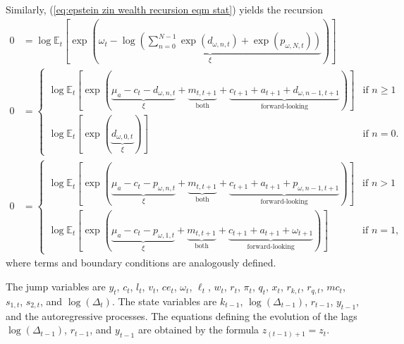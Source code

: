 \documentclass[12 pt, oneside]{article}
\theoremstyle{definition}
\theoremstyle{definition}
\theoremstyle{definition}
\newcommand{\E}{\mathbb{E}}
\begin{document}
Similarly, (\ref{eq:epstein zin wealth recursion eqm stat}) yields the recursion
\begin{align}
  0 & = \log\E_t\left[\exp\left(\underbrace{\omega_t - \log\left(\sum_{n = 0}^{N - 1}\exp(d_{\omega, n, t}) + \exp(p_{\omega, N, t})\right)}_{\xi}\right)\right]\\
  0 & =
      \begin{cases}
        \log\E_t\left[\exp\left(\underbrace{\mu_a - c_t - d_{\omega, n, t}}_{\xi} + \underbrace{m_{t, t + 1}}_{\text{both}} + \underbrace{c_{t + 1} + a_{t + 1} + d_{\omega, n - 1, t + 1}}_{\text{forward-looking}}\right)\right] & \text{if } n \geq 1\\
        \log\E_t\left[\exp\left(\underbrace{d_{\omega, 0, t}}_{\xi}\right)\right] & \text{if } n = 0.
      \end{cases}\\
  0 & =
      \begin{cases}
        \log\E_t\left[\exp\left(\underbrace{\mu_a - c_t - p_{\omega, n, t}}_{\xi} + \underbrace{m_{t, t + 1}}_{\text{both}} + \underbrace{c_{t + 1} + a_{t + 1} + p_{\omega, n - 1, t + 1}}_{\text{forward-looking}} \right)\right] & \text{if } n > 1\\
        \log\E_t\left[\exp\left(\underbrace{\mu_a - c_t - p_{\omega, 1, t}}_{\xi} + \underbrace{m_{t, t + 1}}_{\text{both}} + \underbrace{c_{t + 1} + a_{t + 1} + \omega_{t + 1}}_{\text{forward-looking}}\right)\right] & \text{if } n = 1,
      \end{cases}
\end{align}
where terms and boundary conditions are analogously defined.

The jump variables are $y_t$, $c_t$, $l_t$, $v_t$, $ce_t$, $\omega_t$, $\ell_t$, $w_t$, $r_t$, $\pi_t$, $q_t$, $x_t$, $r_{k, t}$, $r_{q, t}$, $mc_t$, $s_{1, t}$, $s_{2, t}$, and $\log(\Delta_t)$.
The state variables are $k_{t - 1}$, $\log(\Delta_{t - 1})$, $r_{t - 1}$, $y_{t - 1}$, and the autoregressive processes. The equations defining the evolution of the lags $\log(\Delta_{t - 1})$, $r_{t - 1}$, and $y_{t - 1}$ are obtained by the formula $z_{(t - 1) + 1} = z_t$.
\end{document}
